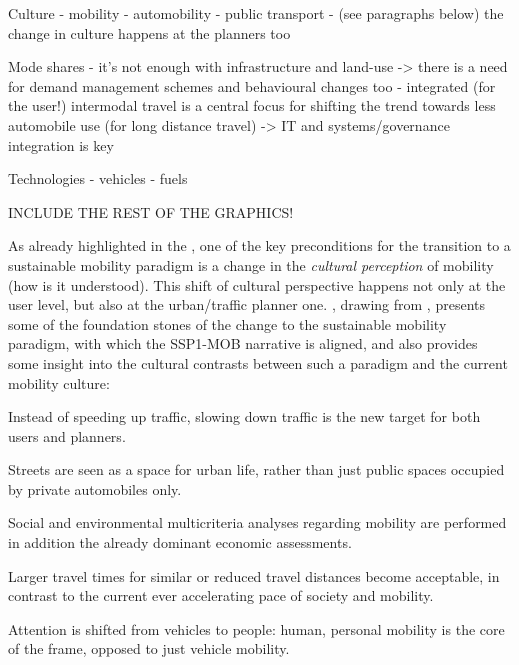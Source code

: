 Culture
 - mobility
 - automobility
 - public transport
 - (see paragraphs below) the change in culture happens at the planners too

Mode shares
 - it's not enough with infrastructure and land-use -> there is a need for demand management schemes and behavioural changes too
 - integrated (for the user!) intermodal travel is a central focus for shifting the trend towards less automobile use (for long distance travel) -> IT and systems/governance integration is key

Technologies
 - vehicles
 - fuels

INCLUDE THE REST OF THE GRAPHICS!

As already highlighted in the , one of the key preconditions for the transition to a sustainable mobility paradigm is a change in the \emph{cultural perception} of mobility (how is it understood). This shift of cultural perspective happens not only at the user level, but also at the urban/traffic planner one. \textcite{banister2008_sustainablemobilityparadigm}, drawing from \textcite{marshall2001_challengesustainabletransport}, presents some of the foundation stones of the change to the sustainable mobility paradigm, with which the SSP1-MOB narrative is aligned, and also provides some insight into the cultural contrasts between such a paradigm and the current mobility culture:
%
\begin{enumeratealpha}
\item Instead of speeding up traffic, slowing down traffic is the new target for both users and planners.
\item Streets are seen as a space for urban life, rather than just public spaces occupied by private automobiles only.
\item Social and environmental multicriteria analyses regarding mobility are performed in addition the already dominant economic assessments.
\item Larger travel times for similar or reduced travel distances become acceptable, in contrast to the current ever accelerating pace of society and mobility.
\item Attention is shifted from vehicles to people: human, personal mobility is the core of the frame, opposed to just vehicle mobility.
\end{enumeratealpha}


